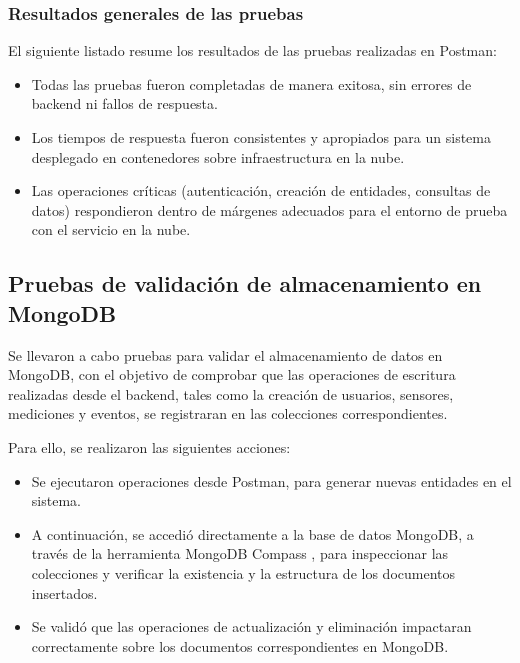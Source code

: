 \subsubsection{Resultados generales de las pruebas}

El siguiente listado resume los resultados de las pruebas realizadas en
Postman:

\begin{itemize}
    \item Todas las pruebas fueron completadas de manera exitosa, sin errores de backend
          ni fallos de respuesta.
    \item Los tiempos de respuesta fueron consistentes y apropiados para un sistema
          desplegado en contenedores sobre infraestructura en la nube.
    \item Las operaciones críticas (autenticación, creación de entidades, consultas de
          datos) respondieron dentro de márgenes adecuados para el entorno de prueba con
          el servicio en la nube.
\end{itemize}

\subsection{Pruebas de validación de almacenamiento en MongoDB}

Se llevaron a cabo pruebas para validar el almacenamiento de datos en MongoDB,
con el objetivo de comprobar que las operaciones de escritura realizadas desde
el backend, tales como la creación de usuarios, sensores, mediciones y eventos,
se registraran en las colecciones correspondientes.

Para ello, se realizaron las siguientes acciones:

\begin{itemize}
    \item Se ejecutaron operaciones desde Postman, para generar nuevas entidades en el
          sistema.
    \item A continuación, se accedió directamente a la base de datos MongoDB, a través de
          la herramienta MongoDB Compass \cite{MongoDBCompass}, para inspeccionar las
          colecciones y verificar la existencia y la estructura de los documentos
          insertados.
    \item Se validó que las operaciones de actualización y eliminación impactaran
          correctamente sobre los documentos correspondientes en MongoDB.
\end{itemize}

